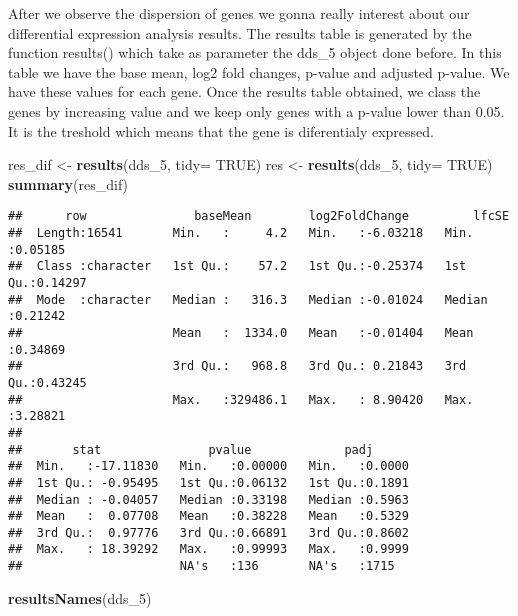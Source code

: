 \documentclass[]{article}
\newenvironment{Shaded}{\begin{snugshade}}{\end{snugshade}}
\newcommand{\KeywordTok}[1]{\textcolor[rgb]{0.13,0.29,0.53}{\textbf{#1}}}
\newcommand{\DataTypeTok}[1]{\textcolor[rgb]{0.13,0.29,0.53}{#1}}
\newcommand{\DecValTok}[1]{\textcolor[rgb]{0.00,0.00,0.81}{#1}}
\newcommand{\StringTok}[1]{\textcolor[rgb]{0.31,0.60,0.02}{#1}}
\newcommand{\OtherTok}[1]{\textcolor[rgb]{0.56,0.35,0.01}{#1}}
\newcommand{\NormalTok}[1]{#1}
\begin{document}
After we observe the dispersion of genes we gonna really interest about
our differential expression analysis results. The results table is
generated by the function results() which take as parameter the dds\_5
object done before. In this table we have the base mean, log2 fold
changes, p-value and adjusted p-value. We have these values for each
gene. Once the results table obtained, we class the genes by increasing
value and we keep only genes with a p-value lower than 0.05. It is the
treshold which means that the gene is diferentialy expressed.

\begin{Shaded}
\begin{Highlighting}[]
\NormalTok{res_dif <-}\StringTok{ }\KeywordTok{results}\NormalTok{(dds_}\DecValTok{5}\NormalTok{, }\DataTypeTok{tidy=} \OtherTok{TRUE}\NormalTok{)}
\NormalTok{res <-}\StringTok{ }\KeywordTok{results}\NormalTok{(dds_}\DecValTok{5}\NormalTok{, }\DataTypeTok{tidy=} \OtherTok{TRUE}\NormalTok{)}
\KeywordTok{summary}\NormalTok{(res_dif)}
\end{Highlighting}
\end{Shaded}

\begin{verbatim}
##      row               baseMean        log2FoldChange         lfcSE        
##  Length:16541       Min.   :     4.2   Min.   :-6.03218   Min.   :0.05185  
##  Class :character   1st Qu.:    57.2   1st Qu.:-0.25374   1st Qu.:0.14297  
##  Mode  :character   Median :   316.3   Median :-0.01024   Median :0.21242  
##                     Mean   :  1334.0   Mean   :-0.01404   Mean   :0.34869  
##                     3rd Qu.:   968.8   3rd Qu.: 0.21843   3rd Qu.:0.43245  
##                     Max.   :329486.1   Max.   : 8.90420   Max.   :3.28821  
##                                                                            
##       stat               pvalue             padj       
##  Min.   :-17.11830   Min.   :0.00000   Min.   :0.0000  
##  1st Qu.: -0.95495   1st Qu.:0.06132   1st Qu.:0.1891  
##  Median : -0.04057   Median :0.33198   Median :0.5963  
##  Mean   :  0.07708   Mean   :0.38228   Mean   :0.5329  
##  3rd Qu.:  0.97776   3rd Qu.:0.66891   3rd Qu.:0.8602  
##  Max.   : 18.39292   Max.   :0.99993   Max.   :0.9999  
##                      NA's   :136       NA's   :1715
\end{verbatim}

\begin{Shaded}
\begin{Highlighting}[]
\KeywordTok{resultsNames}\NormalTok{(dds_}\DecValTok{5}\NormalTok{)}
\end{Highlighting}
\end{Shaded}
\end{document}

